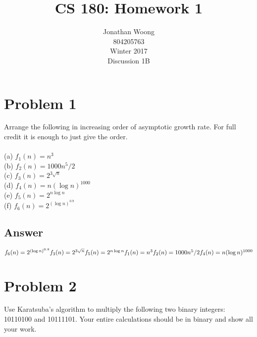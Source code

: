 \documentclass[11pt,letterpaper]{article}
\date{\displaydate{date}}
\begin{document}
\title{CS 180: Homework 1}
\author{
	Jonathan Woong\\
	804205763\\
	Winter 2017\\
	Discussion 1B}
\maketitle
\pagebreak


\section{Problem 1}
Arrange the following in increasing order of asymptotic growth rate. For full credit
it is enough to just give the order.
\\\\
(a) $f_{1}(n)=n^3$ \\
(b) $f_{2}(n)=1000n^5/2$ \\
(c) $f_{3}(n)=2^{3\sqrt{n}}$ \\
(d) $f_{4}(n)=n(\log{n})^{1000}$ \\
(e) $f_{5}(n)=2^{n\log{n}}$ \\
(f) $f_{6}(n)=2^{(\log{n})^{0.9}}$

\subsection{Answer}
$
f_{6}(n)=2^{(\log{n})^{0.9}} \\
f_{3}(n)=2^{3\sqrt{n}} \\
f_{5}(n)=2^{n\log{n}} \\
f_{1}(n)=n^3 \\
f_{2}(n)=1000n^5/2 \\
f_{4}(n)=n(\log{n})^{1000}
$

\pagebreak

\section{Problem 2}
Use Karatsuba’s algorithm to multiply the following two binary integers: 10110100 and
10111101. Your entire calculations should be in binary and show all your work.
\end{document}

